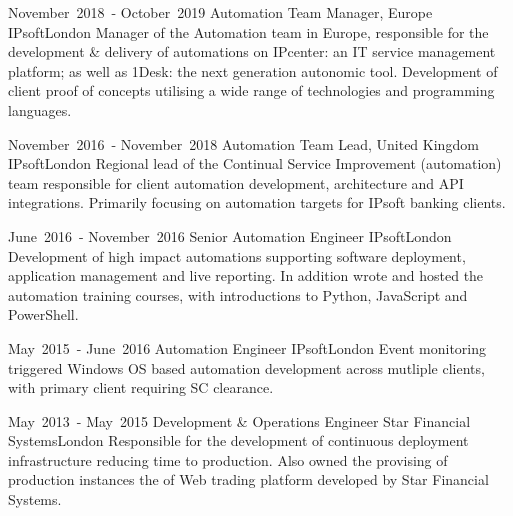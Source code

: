 
\cventry %
  {\mbox{November 2018 -} \mbox{October 2019}}
  {Automation Team Manager, Europe}
  {IPsoft}{London}{}
  {
    Manager of the Automation team in Europe, responsible for the 
    development \& delivery of automations on IPcenter: an IT service management 
    platform; as well as 1Desk: the next generation autonomic tool. 
    Development of client proof of concepts utilising a wide range of technologies and programming languages.\\
  }

\cventry %
  {\mbox{November 2016 -} \mbox{November 2018}}
  {Automation Team Lead, United Kingdom}
  {IPsoft}{London}{}
  {
    Regional lead of the Continual Service Improvement (automation) team responsible 
    for client automation development, architecture and API integrations. 
    Primarily focusing on automation targets for IPsoft banking clients.\\
  }

\cventry %
  {\mbox{June 2016 -} \mbox{November 2016}}
  {Senior Automation Engineer}
  {IPsoft}{London}{}
  {
    Development of high impact automations supporting software deployment, 
    application management and live reporting. In addition wrote and hosted 
    the automation training courses, with introductions to Python, JavaScript and PowerShell.\\
  }

\cventry %
  {\mbox{May 2015 -} \mbox{June 2016}}
  {Automation Engineer}
  {IPsoft}{London}{}
  {
    Event monitoring triggered Windows OS based automation development across 
    mutliple clients, with primary client requiring SC clearance.\\
  }

\cventry %
  {\mbox{May 2013 -} \mbox{May 2015}}
  {Development \& Operations Engineer}
  {Star Financial Systems}{London}{}
  {
    Responsible for the development of continuous deployment infrastructure 
    reducing time to production. Also owned the provising of production 
    instances the of Web trading platform developed by Star Financial Systems.\\
  }

